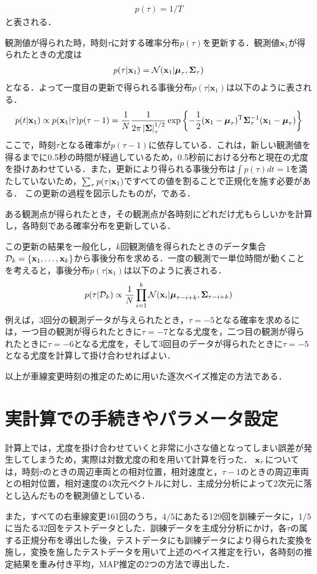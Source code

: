 \begin{align}
p(\tau)=1/T
\end{align}
と表される．
\par
観測値が得られた時，時刻$\tau$に対する確率分布$p(\tau)$を更新する．観測値$\mathbf{x}_1$が得られたときの尤度は
\begin{align}
	p(\tau|\mathbf{x}_1)=\mathcal{N}(\mathbf{x}_1|\boldsymbol{\mu}_\tau,\mathbf{\Sigma}_\tau)
\end{align}
となる．よって一度目の更新で得られる事後分布$p(\tau|\mathbf{x}_1)$は以下のように表される．
\begin{align}
	p(t|\mathbf{x}_1)\propto p(\mathbf{x}_1|\tau)p(\tau-1)=\frac{1}{N}\frac{1}{2\pi\left|\mathbf{\Sigma}\right|_\tau^{1/2}}\exp\left\{-\frac{1}{2}(\mathbf{x}_1-\boldsymbol{\mu}_\tau)^\mathrm{T}\mathbf{\Sigma}_\tau^{-1}(\mathbf{x}_1-\boldsymbol{\mu}_\tau)\right\}
\end{align}
ここで，時刻$\tau$となる確率が$p(\tau-1)$に依存している．これは，新しい観測値を得るまでに0.5秒の時間が経過しているため，0.5秒前における分布と現在の尤度を掛けあわせている．また，更新により得られる事後分布は$\int p(\tau)dt=1$を満たしていないため，$\sum_\tau p(\tau|\mathbf{x}_1)$ですべての値を割ることで正規化を施す必要がある．
この更新の過程を図示したものが，である．

ある観測点が得られたとき，その観測点が各時刻にどれだけ尤もらしいかを計算し，各時刻である確率分布を更新している．
\par
この更新の結果を一般化し，$k$回観測値を得られたときのデータ集合$\mathcal{D}_k=\{\mathbf{x}_1,\ldots,\mathbf{x}_k\}$から事後分布を求める．一度の観測で一単位時間が動くことを考えると，事後分布$p(\tau|\mathbf{x}_1)$は以下のように表される．
\begin{align}
	p(\tau|\mathcal{D}_k)\propto\frac{1}{N}\prod_{i=1}^k \mathcal{N}(\mathbf{x}_i|\boldsymbol{\mu}_{\tau-i+k}, \mathbf{\Sigma}_{\tau-i+k})
\end{align}
例えば，3回分の観測データが与えられたとき，$\tau=-5$となる確率を求めるには，一つ目の観測が得られたときに$\tau=-7$となる尤度を，二つ目の観測が得られたときに$\tau=-6$となる尤度を，そして3回目のデータが得られたときに$\tau=-5$となる尤度を計算して掛け合わせればよい．
\par
以上が車線変更時刻の推定のために用いた逐次ベイズ推定の方法である．
\section{実計算での手続きやパラメータ設定}
計算上では，尤度を掛け合わせていくと非常に小さな値となってしまい誤差が発生してしまうため，実際は対数尤度の和を用いて計算を行った．%
$\mathbf{x}_\tau$については，時刻$\tau$のときの周辺車両との相対位置，相対速度と，$\tau-1$のときの周辺車両との相対位置，相対速度の4次元ベクトルに対し．主成分分析によって2次元に落とし込んだものを観測値としている．
\par
また，すべての右車線変更161回のうち，$4/5$にあたる129回を訓練データに，$1/5$に当たる32回をテストデータとした．訓練データを主成分分析にかけ，各$\tau$の属する正規分布を導出した後，テストデータにも訓練データにより得られた変換を施し，変換を施したテストデータを用いて上述のベイス推定を行い，各時刻の推定結果を重み付き平均，MAP推定の2つの方法で導出した．

